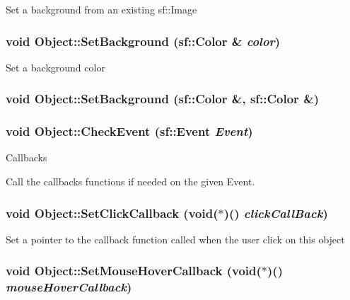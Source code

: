 Set a background from an existing sf::Image \hypertarget{classObject_aa81f5ed57ee0bca860654241a16e325}{
\subsubsection[SetBackground]{\setlength{\rightskip}{0pt plus 5cm}void Object::SetBackground (sf::Color \& {\em color})}}
\label{classObject_aa81f5ed57ee0bca860654241a16e325}




Set a background color \hypertarget{classObject_1abd4bc0011cb25fe9ed940e554d6cbb}{
\subsubsection[SetBackground]{\setlength{\rightskip}{0pt plus 5cm}void Object::SetBackground (sf::Color \&, \/  sf::Color \&)}}
\label{classObject_1abd4bc0011cb25fe9ed940e554d6cbb}


\hypertarget{classObject_b68977125b45e872852613463037cebb}{
\subsubsection[CheckEvent]{\setlength{\rightskip}{0pt plus 5cm}void Object::CheckEvent (sf::Event {\em Event})}}
\label{classObject_b68977125b45e872852613463037cebb}


Callbacks 

Call the callbacks functions if needed on the given Event. \hypertarget{classObject_68e5f5f024cf7f2db43bd2de010c118c}{
\subsubsection[SetClickCallback]{\setlength{\rightskip}{0pt plus 5cm}void Object::SetClickCallback (void($\ast$)() {\em clickCallBack})}}
\label{classObject_68e5f5f024cf7f2db43bd2de010c118c}




Set a pointer to the callback function called when the user click on this object \hypertarget{classObject_82e1ba70ec0e2b9327af29764cd666eb}{
\subsubsection[SetMouseHoverCallback]{\setlength{\rightskip}{0pt plus 5cm}void Object::SetMouseHoverCallback (void($\ast$)() {\em mouseHoverCallback})}}
\label{classObject_82e1ba70ec0e2b9327af29764cd666eb}





